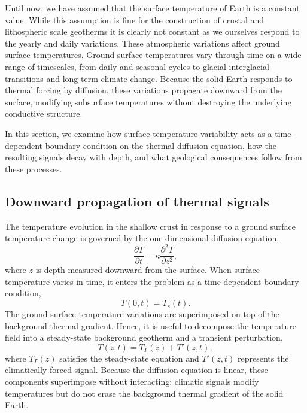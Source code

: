 Until now, we have assumed that the surface temperature of Earth is a constant value.  While this assumption is fine for the construction of crustal and lithospheric scale geotherms it is clearly not constant as we ourselves respond to the yearly and daily variations.  These atmospheric variations affect ground surface temperatures.  Ground surface temperatures vary through time on a wide range of timescales, from daily and seasonal cycles to glacial-interglacial transitions and long-term climate change.  Because the solid Earth responds to thermal forcing by diffusion, these variations propagate downward from the surface, modifying subsurface temperatures without destroying the underlying conductive structure.

In this section, we examine how surface temperature variability acts as a time-dependent boundary condition on the thermal diffusion equation, how the resulting signals decay with depth, and what geological consequences follow from these processes.

\subsection{Downward propagation of thermal signals}

The temperature evolution in the shallow crust in response to a ground surface temperature change is governed by the one-dimensional diffusion equation,
\begin{equation}
    \frac{\partial T}{\partial t} = \kappa \frac{\partial^2 T}{\partial z^2},
\end{equation}
where $z$ is depth measured downward from the surface. When surface temperature varies in time, it enters the problem as a time-dependent boundary condition,
\begin{equation}
    T(0,t) = T_s(t).
\end{equation}
The ground surface temperature variations are superimposed on top of the background thermal gradient.  Hence, it is useful to decompose the temperature field into a steady-state background geotherm and a transient perturbation,
\begin{equation}
    T(z,t) = T_\Gamma(z) + T'(z,t),
\end{equation}
where $T_\Gamma(z)$ satisfies the steady-state equation and $T'(z,t)$ represents the climatically forced signal. Because the diffusion equation is linear, these components superimpose without interacting: climatic signals modify temperatures but do not erase the background thermal gradient of the solid Earth.

